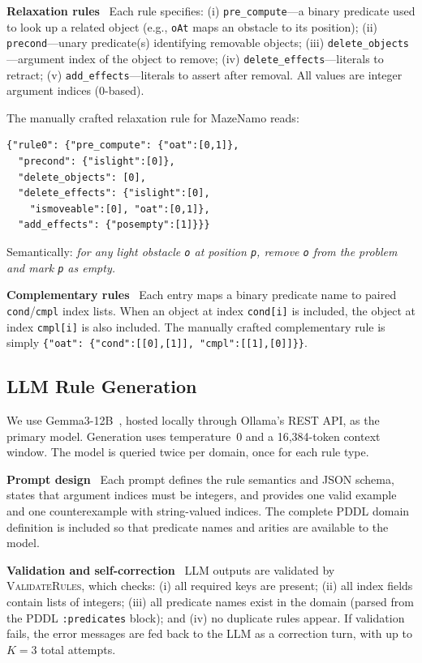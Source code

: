 \documentclass{ieeeaccess}
\newcommand{\myparagraph}[1]{\noindent\textbf{#1}~}
\begin{document}
\myparagraph{Relaxation rules}
Each rule specifies: (i) \texttt{pre\_compute}---a binary predicate used to look up a related object (e.g., \texttt{oAt} maps an obstacle to its position); (ii) \texttt{precond}---unary predicate(s) identifying removable objects; (iii) \texttt{delete\_objects}---argument index of the object to remove; (iv) \texttt{delete\_effects}---literals to retract; (v) \texttt{add\_effects}---literals to assert after removal.
All values are integer argument indices (0-based).

The manually crafted relaxation rule for MazeNamo reads:
\begin{small}
\begin{verbatim}
{"rule0": {"pre_compute": {"oat":[0,1]},
  "precond": {"islight":[0]},
  "delete_objects": [0],
  "delete_effects": {"islight":[0],
    "ismoveable":[0], "oat":[0,1]},
  "add_effects": {"posempty":[1]}}}
\end{verbatim}
\end{small}

Semantically: \emph{for any light obstacle \texttt{o} at position \texttt{p}, remove \texttt{o} from the problem and mark \texttt{p} as empty.}

\myparagraph{Complementary rules}
Each entry maps a binary predicate name to paired \texttt{cond}/\allowbreak\texttt{cmpl} index lists.
When an object at index \texttt{cond[i]} is included, the object at index \texttt{cmpl[i]} is also included.
The manually crafted complementary rule is simply \texttt{\{"oat": \{"cond":[[0],[1]], "cmpl":[[1],[0]]\}\}}.

\subsection{LLM Rule Generation}
\label{sec:generation}

We use Gemma3-12B~\cite{gemma3_2025}, hosted locally through Ollama's REST API, as the primary model.
Generation uses temperature~0 and a 16,384-token context window.
The model is queried twice per domain, once for each rule type.

\myparagraph{Prompt design}
Each prompt defines the rule semantics and JSON schema, states that argument indices must be integers, and provides one valid example and one counterexample with string-valued indices.
The complete PDDL domain definition is included so that predicate names and arities are available to the model.

\myparagraph{Validation and self-correction}
LLM outputs are validated by \textsc{ValidateRules}, which checks: (i) all required keys are present; (ii) all index fields contain lists of integers; (iii) all predicate names exist in the domain (parsed from the PDDL \texttt{:predicates} block); and (iv) no duplicate rules appear.
If validation fails, the error messages are fed back to the LLM as a correction turn, with up to $K=3$ total attempts.
\end{document}
